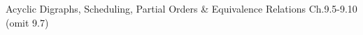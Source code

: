 \documentclass[handout]{mcs}
\begin{document}

\begin{staffnotes}
Acyclic Digraphs, Scheduling, Partial Orders \& Equivalence Relations Ch.9.5-9.10 (omit 9.7)
\end{staffnotes}













\end{document}
